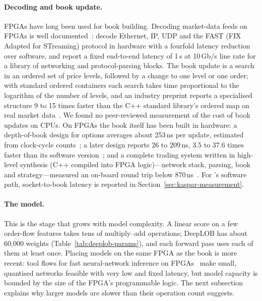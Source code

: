 \paragraph{Decoding and book update.} FPGAs have long been used for book building. Decoding market-data feeds on FPGAs
is well documented~\citep{leber2011,morris2009fpga}: \citet{leber2011} decode Ethernet, IP, UDP and the
FAST (FIX Adapted for STreaming) protocol in hardware with a fourfold latency reduction over software, and \citet{lockwood2012} report a fixed
end-to-end latency of 1\,\textmu s at 10\,Gb/s line rate for a library of networking and protocol-parsing blocks.
The book update is a search in an ordered set of price levels, followed by a change to one level or one order; with
standard ordered containers each search takes time proportional to the logarithm of the number of levels, and an
industry preprint reports a specialised structure 9 to 15 times faster than the C++ standard library's ordered map on
real market data~\citep{krapivensky2025glass}. We found no peer-reviewed measurement of the cost of book updates on
CPUs. On FPGAs the book itself has been built in hardware: a depth-of-book design for options averages about
253\,ns per update, estimated from clock-cycle counts~\citep{dvorak2014book}; a later design reports 26 to 209\,ns,
3.5 to 37.6 times faster than its software version~\citep{liu2024book}; and a complete trading system written in
high-level synthesis (C++ compiled into FPGA logic)---network stack, parsing, book and strategy---measured an on-board round trip below
870\,ns~\citep{boutros2017build}. For \kasparhft{}'s software path, socket-to-book latency is reported in Section~\ref{sec:kaspar-measurement}.

\paragraph{The model.} This is the stage that grows with model complexity. A linear score on a few order-flow
features takes tens of multiply--add operations; DeepLOB has about 60,000 weights (Table~\ref{tab:deeplob-params}),
and each forward pass uses each of them at least once. Placing models on the same FPGA as the book is more recent:
tool flows for fast neural-network inference on FPGAs~\citep{hls4ml} make small, quantised networks feasible with
very low and fixed latency, but model capacity is bounded by the size of the FPGA's programmable logic. The next
subsection explains why larger models are slower than their operation count suggests.

